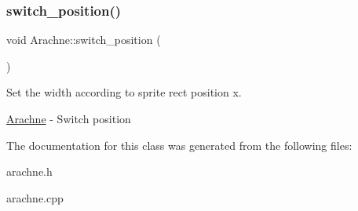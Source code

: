 \subsubsection{\texorpdfstring{switch\+\_\+position()}{switch\_position()}}
{\footnotesize\ttfamily void Arachne\+::switch\+\_\+position (\begin{DoxyParamCaption}{ }\end{DoxyParamCaption})}



Set the width according to sprite rect position x. 

\hyperlink{classArachne}{Arachne} -\/ Switch position 

The documentation for this class was generated from the following files\+:\begin{DoxyCompactItemize}
\item 
arachne.\+h\item 
arachne.\+cpp\end{DoxyCompactItemize}
